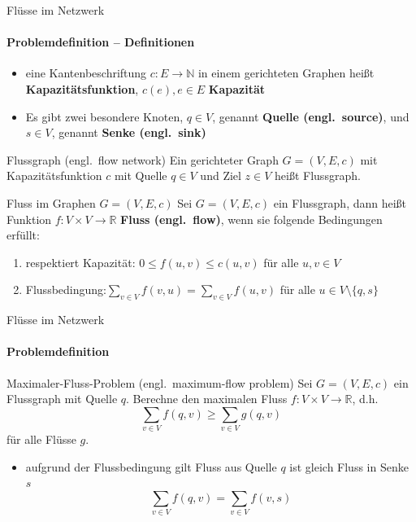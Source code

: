 \documentclass{vorlesung}
\newcommand{\mrk}[1]{\textcolor{ubrot}{\bfseries #1}}
\begin{document}
%
\begin{frame}{Flüsse im Netzwerk}
\framesubtitle{Problemdefinition -- Definitionen}
\begin{itemize}
	\item eine Kantenbeschriftung $c:E\to \mathbb{N}$ in einem gerichteten Graphen heißt \mrk{Kapazitätsfunktion}, $c(e), e\in E$ \mrk{Kapazität}%
	\item Es gibt zwei besondere Knoten, $q\in V$, genannt \mrk{Quelle (engl.\ source)}, und $s\in V$, genannt \mrk{Senke (engl.\ sink)}
\end{itemize}
\begin{block}{Flussgraph (engl.\ flow network)}
Ein gerichteter Graph $G=(V,E,c)$ mit Kapazitätsfunktion $c$ mit Quelle $q\in V$ und Ziel $z\in V$ heißt Flussgraph. 
\end{block}
\begin{block}{Fluss im Graphen $G=(V,E,c)$}
Sei $G=(V,E,c)$ ein Flussgraph, dann heißt Funktion $f:V\times V \to \mathbb{R}$ \mrk{Fluss (engl.\ flow)}, wenn sie folgende Bedingungen erfüllt:%
\begin{enumerate}
	\item respektiert Kapazität: $0\leq f(u,v) \leq c(u,v)$ für alle $u,v\in V$
	\item Flussbedingung:$\!\!\sum\limits_{v\in V} f(v,u)\! =\! \sum\limits_{v\in V} f(u,v)$ für alle $u\in V\setminus \{q,s\}$
\end{enumerate}
\end{block}
\end{frame}
%
\begin{frame}{Flüsse im Netzwerk}
\framesubtitle{Problemdefinition}
\begin{block}{Maximaler-Fluss-Problem (engl.\ maximum-flow problem)}
Sei $G=(V,E,c)$ ein Flussgraph mit Quelle $q$. Berechne den maximalen Fluss $f : V\times V \to \mathbb{R}$, d.h.
$$ \sum_{v\in V} f(q,v) \geq \sum_{v\in V} g(q,v)$$
für alle Flüsse $g$.
\end{block}
\begin{itemize}
	\item aufgrund der Flussbedingung gilt Fluss aus Quelle $q$ ist gleich Fluss in Senke $s$
 $$\sum_{v\in V} f(q,v) = \sum_{v\in V} f(v,s)$$
\end{itemize}
\end{frame}
%
\end{document}
